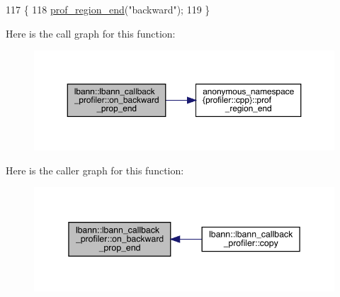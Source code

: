 \begin{DoxyCode}
117                                                            \{
118   \hyperlink{namespaceanonymous__namespace_02profiler_8cpp_03_a7984c26fb186307873a2f83f91715a99}{prof\_region\_end}(\textcolor{stringliteral}{"backward"});
119 \}
\end{DoxyCode}
Here is the call graph for this function\+:\nopagebreak
\begin{figure}[H]
\begin{center}
\leavevmode
\includegraphics[width=350pt]{classlbann_1_1lbann__callback__profiler_a8a4ba2640d128992a519ab4a2b7c44aa_cgraph}
\end{center}
\end{figure}
Here is the caller graph for this function\+:\nopagebreak
\begin{figure}[H]
\begin{center}
\leavevmode
\includegraphics[width=345pt]{classlbann_1_1lbann__callback__profiler_a8a4ba2640d128992a519ab4a2b7c44aa_icgraph}
\end{center}
\end{figure}
\mbox{\label{classlbann_1_1lbann__callback__profiler_a3fe2bc2b07b2e8e5873c9afb94cebe93}} 
